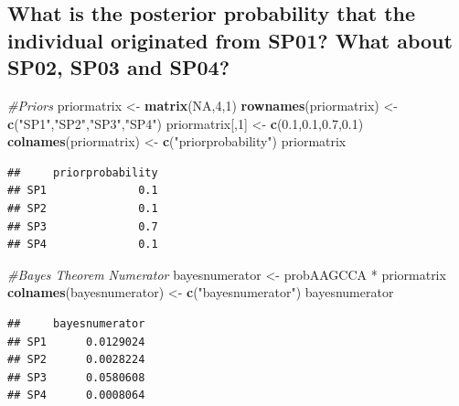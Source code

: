 \documentclass[]{article}
\newenvironment{Shaded}{\begin{snugshade}}{\end{snugshade}}
\newcommand{\KeywordTok}[1]{\textcolor[rgb]{0.13,0.29,0.53}{\textbf{{#1}}}}
\newcommand{\DecValTok}[1]{\textcolor[rgb]{0.00,0.00,0.81}{{#1}}}
\newcommand{\FloatTok}[1]{\textcolor[rgb]{0.00,0.00,0.81}{{#1}}}
\newcommand{\StringTok}[1]{\textcolor[rgb]{0.31,0.60,0.02}{{#1}}}
\newcommand{\CommentTok}[1]{\textcolor[rgb]{0.56,0.35,0.01}{\textit{{#1}}}}
\newcommand{\OtherTok}[1]{\textcolor[rgb]{0.56,0.35,0.01}{{#1}}}
\newcommand{\NormalTok}[1]{{#1}}
\begin{document}
\pagebreak  

\subsection{What is the posterior probability that the individual
originated from SP01? What about SP02, SP03 and
SP04?}\label{what-is-the-posterior-probability-that-the-individual-originated-from-sp01-what-about-sp02-sp03-and-sp04}

\begin{Shaded}
\begin{Highlighting}[]
\CommentTok{#Priors}
\NormalTok{priormatrix <-}\StringTok{ }\KeywordTok{matrix}\NormalTok{(}\OtherTok{NA}\NormalTok{,}\DecValTok{4}\NormalTok{,}\DecValTok{1}\NormalTok{)}
\KeywordTok{rownames}\NormalTok{(priormatrix) <-}\StringTok{ }\KeywordTok{c}\NormalTok{(}\StringTok{"SP1"}\NormalTok{,}\StringTok{"SP2"}\NormalTok{,}\StringTok{"SP3"}\NormalTok{,}\StringTok{"SP4"}\NormalTok{)}
\NormalTok{priormatrix[,}\DecValTok{1}\NormalTok{] <-}\StringTok{ }\KeywordTok{c}\NormalTok{(}\FloatTok{0.1}\NormalTok{,}\FloatTok{0.1}\NormalTok{,}\FloatTok{0.7}\NormalTok{,}\FloatTok{0.1}\NormalTok{)}
\KeywordTok{colnames}\NormalTok{(priormatrix) <-}\StringTok{ }\KeywordTok{c}\NormalTok{(}\StringTok{"priorprobability"}\NormalTok{)}
\NormalTok{priormatrix}
\end{Highlighting}
\end{Shaded}

\begin{verbatim}
##     priorprobability
## SP1              0.1
## SP2              0.1
## SP3              0.7
## SP4              0.1
\end{verbatim}

\begin{Shaded}
\begin{Highlighting}[]
\CommentTok{#Bayes Theorem Numerator}
\NormalTok{bayesnumerator <-}\StringTok{ }\NormalTok{probAAGCCA *}\StringTok{ }\NormalTok{priormatrix}
\KeywordTok{colnames}\NormalTok{(bayesnumerator) <-}\StringTok{ }\KeywordTok{c}\NormalTok{(}\StringTok{"bayesnumerator"}\NormalTok{)}
\NormalTok{bayesnumerator}
\end{Highlighting}
\end{Shaded}

\begin{verbatim}
##     bayesnumerator
## SP1      0.0129024
## SP2      0.0028224
## SP3      0.0580608
## SP4      0.0008064
\end{verbatim}
\end{document}
